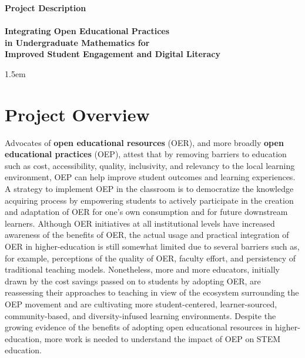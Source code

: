 \documentclass[11pt]{article}
\begin{document}
\thispagestyle{empty}
\begin{center}
\textbf{\Large Project Description}\\[0.25cm]
\hrulefill\\[0.2cm]
\textbf{\Large Integrating Open Educational Practices\\ in Undergraduate Mathematics for \\[0.1cm]Improved Student Engagement and Digital Literacy}\\
\hrulefill
\end{center}
\baselineskip 1.5em


\section{Project Overview}
Advocates of \textbf{open educational resources} (OER), and more broadly \textbf{open educational practices} (OEP), attest that by removing barriers to education such as cost, accessibility, quality, inclusivity, and relevancy to the local learning environment, OEP can help improve student outcomes and learning experiences. A strategy to implement OEP in the classroom is to democratize the knowledge acquiring process by empowering students to actively participate in the creation and adaptation of OER for one's own consumption and for future downstream learners. Although OER initiatives at all institutional levels have increased awareness of the benefits of OER, the actual usage and practical integration of OER in higher-education is still somewhat limited due to several barriers such as, for example, perceptions of the quality of OER, faculty effort, and persistency of traditional teaching models.  Nonetheless, more and more educators, initially drawn by the cost savings passed on to students by adopting OER, are reassessing their approaches to teaching in view of the ecosystem surrounding the OEP movement and are cultivating more student-centered, learner-sourced, community-based, and diversity-infused learning environments.  Despite the growing evidence of the benefits of adopting open educational resources in higher-education, more work is needed to understand the impact of OEP on STEM education.
\end{document}
